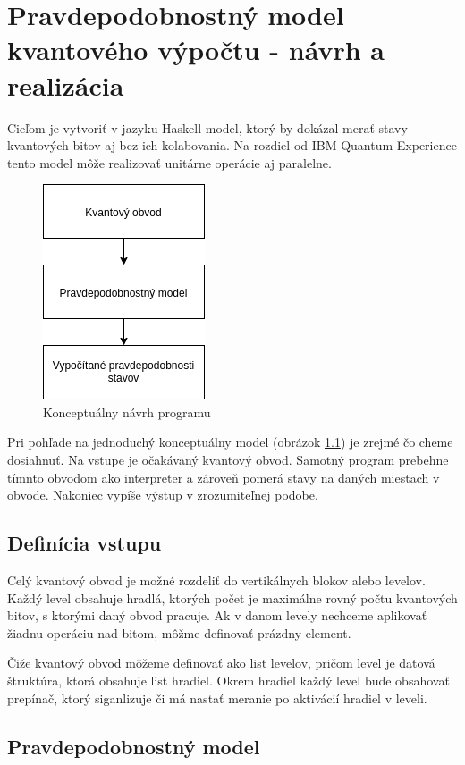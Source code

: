 
\chapter{Pravdepodobnostný model kvantového výpočtu - návrh a realizácia}

Cieľom je vytvoriť v jazyku Haskell model, ktorý by dokázal merať stavy
kvantových bitov aj bez ich kolabovania. Na rozdiel od IBM Quantum
Experience tento model môže realizovať unitárne operácie aj paralelne.

\begin{figure}
	\centering 
	\includegraphics[width=.2\textwidth]{figures/navrh.png} 
	\caption{Konceptuálny návrh programu}
    \label{navrh}
\end{figure}


Pri pohľade na jednoduchý konceptuálny model (obrázok \ref{navrh}) je zrejmé
čo cheme dosiahnuť. Na vstupe je očakávaný kvantový obvod. Samotný program
prebehne tímnto obvodom ako interpreter a zároveň pomerá stavy na daných
miestach v obvode. Nakoniec vypíše výstup v zrozumiteľnej podobe.

\section{Definícia vstupu}

Celý kvantový obvod je možné rozdeliť do vertikálnych blokov alebo levelov.
Každý level obsahuje hradlá, ktorých počet je maximálne rovný počtu 
kvantových bitov, s ktorými daný obvod pracuje. Ak v danom levely nechceme
aplikovať žiadnu operáciu nad bitom, môžme definovať prázdny element.

Čiže kvantový obvod môžeme definovať ako list levelov, pričom level je datová
štruktúra, ktorá obsahuje list hradiel. Okrem hradiel každý level bude
obsahovať prepínač, ktorý siganlizuje či má nastať meranie po aktivácií 
hradiel v leveli.

\section{Pravdepodobnostný model}

